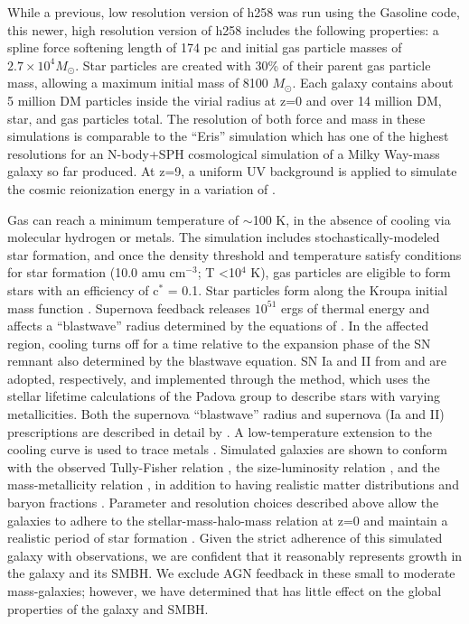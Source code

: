 \documentclass[manuscript]{aastex}
\begin{document}
While a previous, low resolution version of h258 was run using the Gasoline code, this newer, high resolution version of h258 includes the following properties: a spline force softening length of 174 pc and initial gas particle masses of $2.7 \times 10^4 M_{\odot}$. Star particles are created with 30\% of their parent gas particle mass, allowing a maximum initial mass of 8100 $M_{\odot}$. Each galaxy contains about 5 million DM particles inside the virial radius at z=0 and over 14 million DM, star, and gas particles total. The resolution of both force and mass in these simulations is comparable to the ``Eris'' simulation which has one of the highest resolutions for an N-body+SPH cosmological simulation of a Milky Way-mass galaxy so far produced.  At z=9, a uniform UV background is applied to simulate the cosmic reionization energy in a variation of \cite{Haardt2012}.

Gas can reach a minimum temperature of $\sim$100 K, in the absence of cooling via molecular hydrogen or metals. The simulation includes stochastically-modeled star formation, and once the density threshold and temperature satisfy conditions for star formation (10.0 amu cm$^{-3}$; T \textless 10$^4$ K), gas particles are eligible to form stars with an efficiency of c$^*$ = 0.1. Star particles form along the Kroupa initial mass function \citep{Kroupa2001}. Supernova feedback releases $10^{51}$ ergs of thermal energy and affects a ``blastwave'' radius determined by the equations of \cite{Ostriker1988}. In the affected region, cooling turns off for a time relative to the expansion phase of the SN remnant also determined by the blastwave equation. SN Ia and II from \cite{Thielemann1986} and \cite{Woosley1986} are adopted, respectively, and implemented through the \cite{Raiteri1996} method, which uses the stellar lifetime calculations of the Padova group \citep{Alongi1993, Bressan1993, Bertelli1994} to describe stars with varying metallicities. Both the supernova ``blastwave'' radius and supernova (Ia and II) prescriptions are described in detail by \cite{Stinson2006}. A low-temperature extension to the cooling curve is used to trace metals \citep{Bromm2001}. Simulated galaxies are shown to conform with the observed Tully-Fisher relation \citep{Governato2009}, the size-luminosity relation \citep{Brooks2011}, and the mass-metallicity relation \citep{Brooks2007}, in addition to having realistic matter distributions and baryon fractions \citep{Governato2009a,Guedes2011}. Parameter and resolution choices described above allow the galaxies to adhere to the stellar-mass-halo-mass relation at z=0 and maintain a realistic period of star formation \citep{Moster2010,Munshi2013,Brooks2007,Maiolino2008}. Given the strict adherence of this simulated galaxy with observations, we are confident that it reasonably represents growth in the galaxy and its SMBH. We exclude AGN feedback in these small to moderate mass-galaxies; however, we have determined that has little effect on the global properties of the galaxy and SMBH.
 
\end{document}

